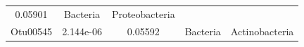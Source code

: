 \documentclass[]{article}
\begin{document}
\begin{longtable}[]{@{}ccccc@{}}
\begin{minipage}[t]{0.12\columnwidth}
0.05901\strut
\end{minipage} & \begin{minipage}[t]{0.13\columnwidth}\centering\strut
Bacteria\strut
\end{minipage} & \begin{minipage}[t]{0.20\columnwidth}\centering\strut
Proteobacteria\strut
\end{minipage}\tabularnewline
\begin{minipage}[t]{0.13\columnwidth}\centering\strut
Otu00545\strut
\end{minipage} & \begin{minipage}[t]{0.14\columnwidth}\centering\strut
2.144e-06\strut
\end{minipage} & \begin{minipage}[t]{0.12\columnwidth}\centering\strut
0.05592\strut
\end{minipage} & \begin{minipage}[t]{0.13\columnwidth}\centering\strut
Bacteria\strut
\end{minipage} & \begin{minipage}[t]{0.20\columnwidth}\centering\strut
Actinobacteria\strut
\end{minipage}\tabularnewline
\bottomrule
\end{longtable}
\end{document}
